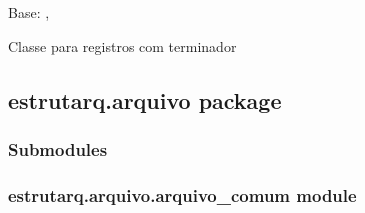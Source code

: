\documentclass[letterpaper,10pt,brazil]{sphinxmanual}
\begin{document}
\begin{fulllineitems}
\label{\detokenize{estrutarq.registro:estrutarq.registro.registro_comum.RegistroTerminador}}
\pysigstartsignatures
{}
\pysigstopsignatures
\sphinxAtStartPar
Base: {\hyperref[\detokenize{estrutarq.dado:estrutarq.dado.DadoTerminador}]{}}, {\hyperref[\detokenize{estrutarq.registro:estrutarq.registro.registro_comum.RegistroBasico}]{}}

\sphinxAtStartPar
Classe para registros com terminador

\end{fulllineitems}


\sphinxstepscope


\subsection{estrutarq.arquivo package}
\label{\detokenize{estrutarq.arquivo:estrutarq-arquivo-package}}\label{\detokenize{estrutarq.arquivo::doc}}

\subsubsection{Submodules}
\label{\detokenize{estrutarq.arquivo:submodules}}

\subsubsection{estrutarq.arquivo.arquivo\_comum module}
\label{\detokenize{estrutarq.arquivo:module-estrutarq.arquivo.arquivo_comum}}\label{\detokenize{estrutarq.arquivo:estrutarq-arquivo-arquivo-comum-module}}
\end{document}
